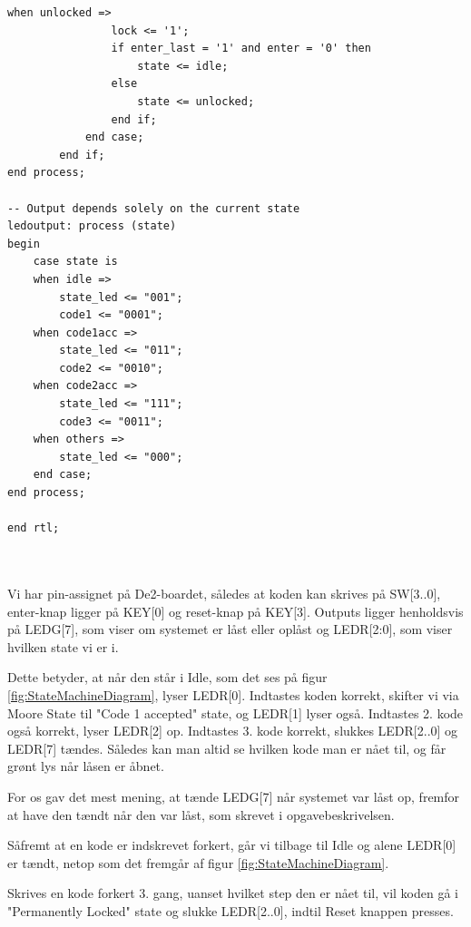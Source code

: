 \begin{enumerate}
\begin{lstlisting}[caption={VHDL koden for kodelås},label={lst:code_lock}]
			when unlocked =>
				lock <= '1';
				if enter_last = '1' and enter = '0' then
					state <= idle;
				else
					state <= unlocked;
				end if;
			end case;
		end if;
end process;

-- Output depends solely on the current state
ledoutput: process (state)
begin
	case state is
	when idle =>
		state_led <= "001";
		code1 <= "0001";
	when code1acc =>
		state_led <= "011";
		code2 <= "0010";
	when code2acc =>
		state_led <= "111";
		code3 <= "0011";
	when others =>
		state_led <= "000";
	end case;
end process;

end rtl;



\end{lstlisting}

Vi har pin-assignet på De2-boardet, således at koden kan skrives på SW[3..0], enter-knap ligger på KEY[0] og reset-knap på KEY[3]. Outputs ligger henholdsvis på LEDG[7], som viser om systemet er låst eller oplåst og LEDR[2:0], som viser hvilken state vi er i. 

Dette betyder, at når den står i Idle, som det ses på figur \ref{fig:StateMachineDiagram}, lyser LEDR[0]. Indtastes koden korrekt, skifter vi via Moore State til "Code 1 accepted" state, og LEDR[1] lyser også.
Indtastes 2. kode også korrekt, lyser LEDR[2] op. 
Indtastes 3. kode korrekt, slukkes LEDR[2..0] og LEDR[7] tændes. Således kan man altid se hvilken kode man er nået til, og får grønt lys når låsen er åbnet. 

For os gav det mest mening, at tænde LEDG[7] når systemet var låst op, fremfor at have den tændt når den var låst, som skrevet i opgavebeskrivelsen. 


Såfremt at en kode er indskrevet forkert, går vi tilbage til Idle og alene LEDR[0] er tændt, netop som det fremgår af figur \ref{fig:StateMachineDiagram}. 

Skrives en kode forkert 3. gang, uanset hvilket step den er nået til, vil koden gå i "Permanently Locked" state og slukke LEDR[2..0], indtil Reset knappen presses.


\end{enumerate}
